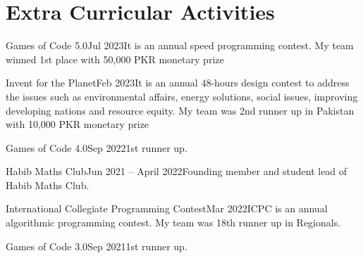 \section{Extra Curricular Activities}
\vspace{2pt}
\resumeSubHeadingListStart

\resumeOrganizationHeading
{Games of Code 5.0}{Jul 2023}{It is an annual speed programming contest. My team winned 1st place with 50,000 PKR monetary prize}

\resumeOrganizationHeading
{Invent for the Planet}{Feb 2023}{It is an annual 48-hours design contest to address the issues such as environmental affairs, energy solutions, social issues, improving developing nations and resource equity. My team was 2nd runner up in Pakistan with 10,000 PKR monetary prize}


\resumeOrganizationHeading
{Games of Code 4.0}{Sep 2022}{1st runner up.}

\resumeOrganizationHeading
{Habib Maths Club}{Jun 2021 -- April 2022}{Founding member and student lead of Habib Maths Club.}

\resumeOrganizationHeading
{International Collegiate Programming Contest}{Mar 2022}{ICPC is an annual algorithmic programming contest. My team was 18th runner up in Regionals.}

\resumeOrganizationHeading
{Games of Code 3.0}{Sep 2021}{1st runner up.}

\resumeSubHeadingListEnd
